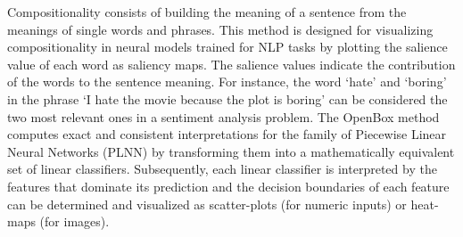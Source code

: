 \documentclass[final,1p,times]{elsarticle}
\begin{document}
Compositionality \cite{li2016visualizing} consists of building the meaning of a sentence from the meanings of single words and phrases. This method is designed for visualizing compositionality in neural models trained for NLP tasks by plotting the salience value of each word as saliency maps. The salience values indicate the contribution of the words to the sentence meaning. For instance, the word `hate' and `boring' in the phrase `I hate the movie because the plot is boring' can be considered the two most relevant ones in a sentiment analysis problem.
The OpenBox method \cite{chu2018exact} computes exact and consistent interpretations for the family of Piecewise Linear Neural Networks (PLNN) by transforming them into a mathematically equivalent set of linear classifiers. Subsequently,  each linear classifier is interpreted by the features that dominate its prediction and the decision boundaries of each feature can be determined and visualized as scatter-plots (for numeric inputs) or heat-maps (for images). 
\end{document}
